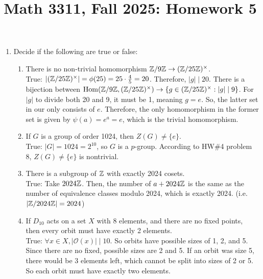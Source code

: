 \documentclass{amsart}
\title{Math 3311, Fall 2025: Homework 5}
\begin{document}
\maketitle





\begin{enumerate}[itemsep=0.2in]

\item Decide if the following are true or false:
\begin{enumerate}
	\item There is no non-trivial homomorphism $\mathbb{Z}/9\mathbb{Z} \to (\mathbb{Z}/25\mathbb{Z})^\times$.\\

    True: $|(\mathbb{Z}/25\mathbb{Z})^\times|=\phi(25)=25\cdot\frac45=20$. Therefore, $|g|\mid20$.
    There is a bijection between $\mathrm{Hom}(\mathbb{Z}/9\mathbb{Z},(\mathbb{Z}/25\mathbb{Z})^\times)\to\{g\in(\mathbb{Z}/25\mathbb{Z})^\times:|g|\mid9\}$.
    For $|g|$ to divide both 20 and 9, it must be 1, meaning $g=e$. So, the latter set in our only consists of $e$. Therefore, the only homomorphism in the former set is given by $\psi(a)=e^a=e$, which is the trivial homomorphism.
   

	\item If $G$ is a group of order 1024, then $Z(G) \neq \{e\}$.\\

    True: $|G|=1024=2^{10}$, so $G$ is a $p$-group. According to HW\#4 problem 8, $Z(G)\neq\{e\}$ is nontrivial.
	
	\item There is a subgroup of $\mathbb{Z}$ with exactly 2024 cosets.\\

    True: Take $2024\mathbb{Z}$. Then, the number of $a+2024\mathbb{Z}$ is the same as the number of equivalence classes modulo 2024, which is exactly 2024. (i.e. $|\mathbb{Z}/2024\mathbb{Z}|=2024$)
    
    
	\item If $D_{10}$ acts on a set $X$ with $8$ elements, and there are no fixed points, then every orbit must have exactly 2 elements.\\

    True: $\forall x\in X,|\mathcal O(x)|\mid10$. So orbits have possible sizes of 1, 2, and 5. Since there are no fixed, possible sizes are 2 and 5. If an orbit was size 5, there would be 3 elements left, which cannot be split into sizes of 2 or 5. So each orbit must have exactly two elements.\\


\end{enumerate}
\end{enumerate}
\end{document}
